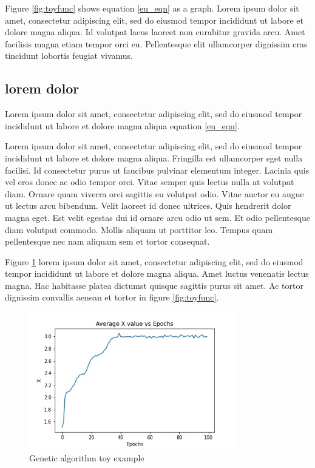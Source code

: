 \documentclass{cup-ino}
\begin{document}
\noindent Figure \ref{fig:toyfunc} shows equation \ref{eu_eqn} as a graph. Lorem ipsum dolor sit amet, consectetur adipiscing elit, sed do eiusmod tempor incididunt ut labore et dolore magna aliqua. Id volutpat lacus laoreet non curabitur gravida arcu. Amet facilisis magna etiam tempor orci eu. Pellentesque elit ullamcorper dignissim cras tincidunt lobortis feugiat vivamus.
\subsection{lorem dolor}
Lorem ipsum dolor sit amet, consectetur adipiscing elit, sed do eiusmod tempor incididunt ut labore et dolore magna aliqua equation \ref{eu_eqn}.

Lorem ipsum dolor sit amet, consectetur adipiscing elit, sed do eiusmod tempor incididunt ut labore et dolore magna aliqua. Fringilla est ullamcorper eget nulla facilisi. Id consectetur purus ut faucibus pulvinar elementum integer. Lacinia quis vel eros donec ac odio tempor orci. Vitae semper quis lectus nulla at volutpat diam. Ornare quam viverra orci sagittis eu volutpat odio. Vitae auctor eu augue ut lectus arcu bibendum. Velit laoreet id donec ultrices. Quis hendrerit dolor magna eget. Est velit egestas dui id ornare arcu odio ut sem. Et odio pellentesque diam volutpat commodo. Mollis aliquam ut porttitor leo. Tempus quam pellentesque nec nam aliquam sem et tortor consequat.

Figure \ref{fig:gen_toy_ex} lorem ipsum dolor sit amet, consectetur adipiscing elit, sed do eiusmod tempor incididunt ut labore et dolore magna aliqua. Amet luctus venenatis lectus magna. Hac habitasse platea dictumst quisque sagittis purus sit amet. Ac tortor dignissim convallis aenean et tortor in figure \ref{fig:toyfunc}.

\begin{figure}
\centering
\includegraphics[width=0.8\textwidth]{images/gen_toy_ex.jpeg}
\caption{Genetic algorithm toy example}
\label{fig:gen_toy_ex}
\end{figure}
\end{document}
